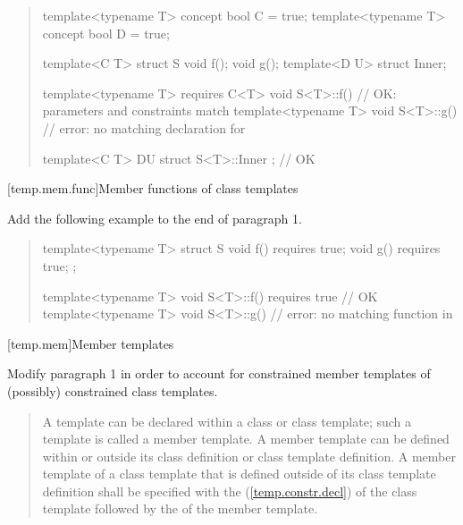 \begin{quote}
\begin{addedblock}
\enterexample
\begin{codeblock}
template<typename T> concept bool C = true;
template<typename T> concept bool D = true;

template<C T> struct S {
    void f();
    void g();
    template<D U> struct Inner;
  }

template<typename T> requires C<T> void S<T>::f() { } // OK: parameters and constraints match
template<typename T> void S<T>::g() { } // error: no matching declaration for 

template<C T> D{U} struct S<T>::Inner { }; // OK
\end{codeblock}
\exitexample
\end{addedblock}
\end{quote}


[temp.mem.func]{Member functions of class templates}

Add the following example to the end of paragraph 1.

\begin{quote}
\begin{addedblock}
\enterexample
\begin{codeblock}
template<typename T> struct S {
  void f() requires true;
  void g() requires true;
};

template<typename T> 
  void S<T>::f() requires true { } // OK
template<typename T> 
  void S<T>::g() { }               // error: no matching function in 
\end{codeblock}
\exitexample
\end{addedblock}
\end{quote}


[temp.mem]{Member templates}


Modify paragraph 1 in order to account for constrained member templates
of (possibly) constrained class templates. 

\begin{quote}
\pnum
A template can be declared within a class or class template; such a 
template is called a member template. 
% 
A member template can be defined within or outside its class definition 
or class template definition. 
% 
A member template of a class template that is defined outside of its 
class template definition shall be specified with the 
 
(\ref{temp.constr.decl}) of the class template followed by the 
 of the member template.
\end{quote}


